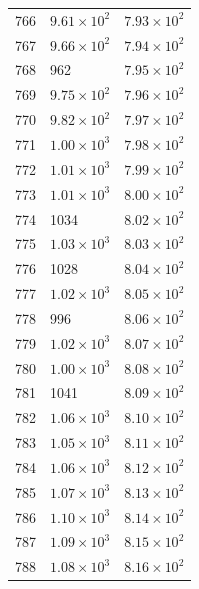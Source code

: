 \begin{table}[H]
\begin{tabular}{lll}
766 & $\displaystyle 9.61 \times 10^{2}$ & $\displaystyle 7.93 \times 10^{2}$ \\
767 & $\displaystyle 9.66 \times 10^{2}$ & $\displaystyle 7.94 \times 10^{2}$ \\
768 & 962 & $\displaystyle 7.95 \times 10^{2}$ \\
769 & $\displaystyle 9.75 \times 10^{2}$ & $\displaystyle 7.96 \times 10^{2}$ \\
770 & $\displaystyle 9.82 \times 10^{2}$ & $\displaystyle 7.97 \times 10^{2}$ \\
771 & $\displaystyle 1.00 \times 10^{3}$ & $\displaystyle 7.98 \times 10^{2}$ \\
772 & $\displaystyle 1.01 \times 10^{3}$ & $\displaystyle 7.99 \times 10^{2}$ \\
773 & $\displaystyle 1.01 \times 10^{3}$ & $\displaystyle 8.00 \times 10^{2}$ \\
774 & 1034 & $\displaystyle 8.02 \times 10^{2}$ \\
775 & $\displaystyle 1.03 \times 10^{3}$ & $\displaystyle 8.03 \times 10^{2}$ \\
776 & 1028 & $\displaystyle 8.04 \times 10^{2}$ \\
777 & $\displaystyle 1.02 \times 10^{3}$ & $\displaystyle 8.05 \times 10^{2}$ \\
778 & 996 & $\displaystyle 8.06 \times 10^{2}$ \\
779 & $\displaystyle 1.02 \times 10^{3}$ & $\displaystyle 8.07 \times 10^{2}$ \\
780 & $\displaystyle 1.00 \times 10^{3}$ & $\displaystyle 8.08 \times 10^{2}$ \\
781 & 1041 & $\displaystyle 8.09 \times 10^{2}$ \\
782 & $\displaystyle 1.06 \times 10^{3}$ & $\displaystyle 8.10 \times 10^{2}$ \\
783 & $\displaystyle 1.05 \times 10^{3}$ & $\displaystyle 8.11 \times 10^{2}$ \\
784 & $\displaystyle 1.06 \times 10^{3}$ & $\displaystyle 8.12 \times 10^{2}$ \\
785 & $\displaystyle 1.07 \times 10^{3}$ & $\displaystyle 8.13 \times 10^{2}$ \\
786 & $\displaystyle 1.10 \times 10^{3}$ & $\displaystyle 8.14 \times 10^{2}$ \\
787 & $\displaystyle 1.09 \times 10^{3}$ & $\displaystyle 8.15 \times 10^{2}$ \\
788 & $\displaystyle 1.08 \times 10^{3}$ & $\displaystyle 8.16 \times 10^{2}$ \\

\end{tabular}
\end{table}
